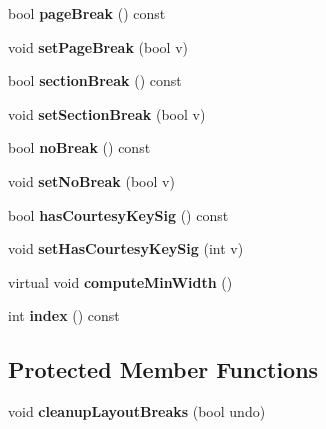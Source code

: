 \begin{DoxyCompactItemize}
\item 
\mbox{\label{class_ms_1_1_measure_base_a6c58c83a689bd9d8caa462ab3559b176}} 
bool {\bfseries page\+Break} () const
\item 
\mbox{\label{class_ms_1_1_measure_base_aab85a5d7b01dd5f816168d3e8a6e4dad}} 
void {\bfseries set\+Page\+Break} (bool v)
\item 
\mbox{\label{class_ms_1_1_measure_base_a56dcf6a02946fd9da8b5a255d7ea09d6}} 
bool {\bfseries section\+Break} () const
\item 
\mbox{\label{class_ms_1_1_measure_base_a0cf3aae4535ef71cc3ac6aca5bc4777d}} 
void {\bfseries set\+Section\+Break} (bool v)
\item 
\mbox{\label{class_ms_1_1_measure_base_ac8216e757cdc34ebc9a840900e040edf}} 
bool {\bfseries no\+Break} () const
\item 
\mbox{\label{class_ms_1_1_measure_base_aa0889f79c9c86287199541a1d8a2fdab}} 
void {\bfseries set\+No\+Break} (bool v)
\item 
\mbox{\label{class_ms_1_1_measure_base_aa6883298f77340342735e6e724021421}} 
bool {\bfseries has\+Courtesy\+Key\+Sig} () const
\item 
\mbox{\label{class_ms_1_1_measure_base_a11523dcf5e769ae1b378d3cc94680420}} 
void {\bfseries set\+Has\+Courtesy\+Key\+Sig} (int v)
\item 
\mbox{\label{class_ms_1_1_measure_base_a4c0c387416b42decef16b9f25d2b935f}} 
virtual void {\bfseries compute\+Min\+Width} ()
\item 
\mbox{\label{class_ms_1_1_measure_base_a5ed5fd23f98bb8a1bbd5941fb6b5568b}} 
int {\bfseries index} () const
\end{DoxyCompactItemize}
\subsection*{Protected Member Functions}
\begin{DoxyCompactItemize}
\item 
\mbox{\label{class_ms_1_1_measure_base_a6ffcd00b3bb7c55cf1deca51648f788c}} 
void {\bfseries cleanup\+Layout\+Breaks} (bool undo)
\end{DoxyCompactItemize}
